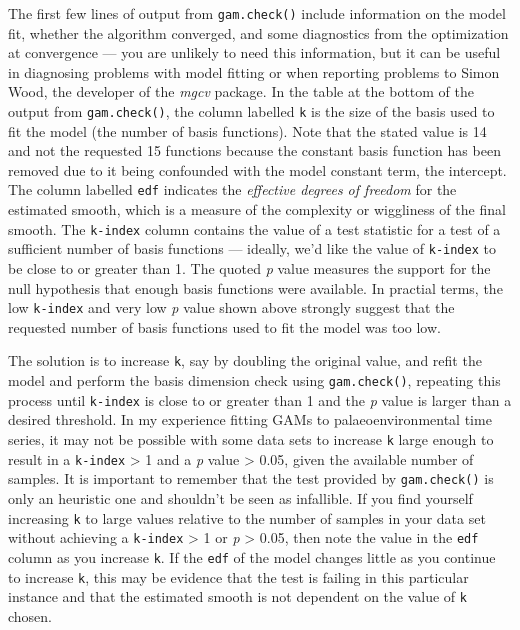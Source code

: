 \documentclass[12pt,]{article}
\begin{document}
The first few lines of output from \texttt{gam.check()} include
information on the model fit, whether the algorithm converged, and some
diagnostics from the optimization at convergence --- you are unlikely to
need this information, but it can be useful in diagnosing problems with
model fitting or when reporting problems to Simon Wood, the developer of
the \emph{mgcv} package. In the table at the bottom of the output from
\texttt{gam.check()}, the column labelled \texttt{k\textquotesingle{}}
is the size of the basis used to fit the model (the number of basis
functions). Note that the stated value is 14 and not the requested 15
functions because the constant basis function has been removed due to it
being confounded with the model constant term, the intercept. The column
labelled \texttt{edf} indicates the \emph{effective degrees of freedom}
for the estimated smooth, which is a measure of the complexity or
wiggliness of the final smooth. The \texttt{k-index} column contains the
value of a test statistic for a test of a sufficient number of basis
functions --- ideally, we'd like the value of \texttt{k-index} to be
close to or greater than 1. The quoted \emph{p} value measures the
support for the null hypothesis that enough basis functions were
available. In practial terms, the low \texttt{k-index} and very low
\emph{p} value shown above strongly suggest that the requested number of
basis functions used to fit the model was too low.

The solution is to increase \texttt{k}, say by doubling the original
value, and refit the model and perform the basis dimension check using
\texttt{gam.check()}, repeating this process until \texttt{k-index} is
close to or greater than 1 and the \emph{p} value is larger than a
desired threshold. In my experience fitting GAMs to palaeoenvironmental
time series, it may not be possible with some data sets to increase
\texttt{k} large enough to result in a \texttt{k-index} \textgreater{} 1
and a \emph{p} value \textgreater{} 0.05, given the available number of
samples. It is important to remember that the test provided by
\texttt{gam.check()} is only an heuristic one and shouldn't be seen as
infallible. If you find yourself increasing \texttt{k} to large values
relative to the number of samples in your data set without achieving a
\texttt{k-index} \textgreater{} 1 or \emph{p} \textgreater{} 0.05, then
note the value in the \texttt{edf} column as you increase \texttt{k}. If
the \texttt{edf} of the model changes little as you continue to increase
\texttt{k}, this may be evidence that the test is failing in this
particular instance and that the estimated smooth is not dependent on
the value of \texttt{k} chosen.
\end{document}
